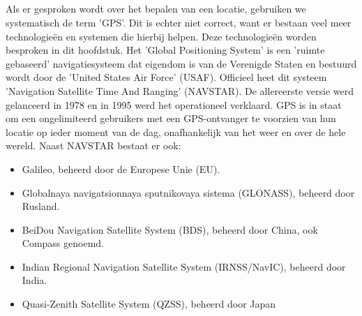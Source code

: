 \subsection{}
Als er gesproken wordt over het bepalen van een locatie, gebruiken we systematisch de term 'GPS'. \autocite{gnss} Dit is echter niet correct, want er bestaan veel meer technologieën en systemen die hierbij helpen. Deze technologieën worden besproken in dit hoofdstuk.
\newline
Het 'Global Positioning System' is een 'ruimte gebaseerd' navigatiesysteem dat eigendom is van de Verenigde Staten en bestuurd wordt door de 'United States Air Force' (USAF). Officieel heet dit systeem 'Navigation Satellite Time And Ranging' (NAVSTAR). De allereerste versie werd gelanceerd in 1978 en in 1995 werd het operationeel verklaard. GPS is in staat om een ongelimiteerd gebruikers met een GPS-ontvanger te voorzien van hun locatie op ieder moment van de dag, onafhankelijk van het weer en over de hele wereld. \autocite{gps}
\newline
Naast NAVSTAR bestaat er ook:
\begin{itemize}
	\item Galileo, beheerd door de Europese Unie (EU).
	\item Globalnaya navigatsionnaya sputnikovaya sistema (GLONASS), beheerd door Rusland.
	\item BeiDou Navigation Satellite System (BDS), beheerd door China, ook Compass genoemd.
	\item Indian Regional Navigation Satellite System (IRNSS/NavIC), beheerd door India.
	\item Quasi-Zenith Satellite System (QZSS), beheerd door Japan
\end{itemize}

